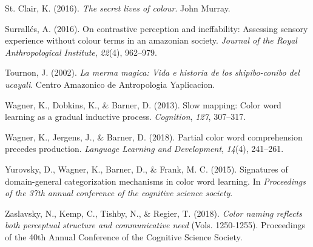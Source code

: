 \documentclass[
  english,
  ,man,floatsintext]{apa6}
\begin{document}
\leavevmode\hypertarget{ref-stclair2016}{}%
St. Clair, K. (2016). \emph{The secret lives of colour}. John Murray.

\leavevmode\hypertarget{ref-surralles2016}{}%
Surrallés, A. (2016). On contrastive perception and ineffability: Assessing sensory experience without colour terms in an amazonian society. \emph{Journal of the Royal Anthropological Institute}, \emph{22}(4), 962--979.

\leavevmode\hypertarget{ref-tournon2002}{}%
Tournon, J. (2002). \emph{La merma magica: Vida e historia de los shipibo-conibo del ucayali}. Centro Amazonico de Antropologia Yaplicacion.

\leavevmode\hypertarget{ref-wagner2013}{}%
Wagner, K., Dobkins, K., \& Barner, D. (2013). Slow mapping: Color word learning as a gradual inductive process. \emph{Cognition}, \emph{127}, 307--317.

\leavevmode\hypertarget{ref-wagner2018}{}%
Wagner, K., Jergens, J., \& Barner, D. (2018). Partial color word comprehension precedes production. \emph{Language Learning and Development}, \emph{14}(4), 241--261.

\leavevmode\hypertarget{ref-yurovsky2015}{}%
Yurovsky, D., Wagner, K., Barner, D., \& Frank, M. C. (2015). Signatures of domain-general categorization mechanisms in color word learning. In \emph{Proceedings of the 37th annual conference of the cognitive science society}.

\leavevmode\hypertarget{ref-zaslavsky2018}{}%
Zaslavsky, N., Kemp, C., Tishby, N., \& Regier, T. (2018). \emph{Color naming reflects both perceptual structure and communicative need} (Vols. 1250-1255). Proceedings of the 40th Annual Conference of the Cognitive Science Society.

\endgroup
\end{document}
